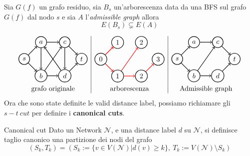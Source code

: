 \documentclass[a4paper, 11pt]{report}
\newcommand*{\mc}[1]{\mathcal{#1}}
\begin{document}
\begin{obs}{}{}
    Sia $G(f)$ un grafo residuo, sia $B_s$ un'arborescenza data da una BFS sul grafo $G(f)$ dal nodo $s$ e sia $A$ l'\textit{admissible graph} allora
    \[E(B_s)\subsetneq E(A)\]
\end{obs}

\[
    \begin{array}{c|c|c}
        
    
    \begin{tikzpicture}[node distance={12mm}, thick , main/.style = {draw, circle}] 
    \node[main] (1) {$s$}; 
    \node[main] (2) [above right of=1] {$a$};
    \node[main] (3) [below right of=1] {$b$};
    \node[main] (4) [right of=2] {$c$};
    \node[main] (5) [right of=3] {$d$};
    \node[main] (6) [above right of=5] {$t$};
    \draw[->] (1) to (2);
    \draw[->] (1) to (3);
    \draw[->] (3) to (5);
    \draw[->] (2) to (4);
    \draw[->] (5) to (6);
    \draw[->] (4) to (6);
    \draw[->] (3) to (4);
    \draw[->] (4) to (5);
    \draw[->] (5) to (2);
    \draw[->] (2) to (3);
\end{tikzpicture}  &
\begin{tikzpicture}[node distance={12mm}, thick , main/.style = {draw, circle}] 
    \node[main] (1) {$0$}; 
    \node[main] (2) [above right of=1] {$1$};
    \node[main] (3) [below right of=1] {$1$};
    \node[main] (4) [right of=2] {$2$};
    \node[main] (5) [right of=3] {$2$};
    \node[main] (6) [above right of=5] {$3$};
    \draw[->, red] (1) to (2);
    \draw[->, red] (1) to (3);
    \draw[->, red] (3) to (5);
    \draw[->, red] (5) to (6);
    \draw[->, red] (3) to (4);
\end{tikzpicture} &
\begin{tikzpicture}[node distance={12mm}, thick , main/.style = {draw, circle}] 
    \node[main] (1) {$s$}; 
    \node[main] (2) [above right of=1] {$a$};
    \node[main] (3) [below right of=1] {$b$};
    \node[main] (4) [right of=2] {$c$};
    \node[main] (5) [right of=3] {$d$};
    \node[main] (6) [above right of=5] {$t$};
    \draw[->] (1) to (2);
    \draw[->] (1) to (3);
    \draw[->] (3) to (5);
    \draw[->] (5) to (6);
    \draw[->] (3) to (4);
    \draw[->] (2) to (4);
    \draw[->] (4) to (6);
\end{tikzpicture} \\
\text{grafo originale}&\text{arborescenza} & \text{Admissible graph}
\end{array} 
\]
Ora che sono state definite le valid distance label, possiamo richiamare gli $s-t\ cut$ per definire i \textbf{canonical cuts}.
\begin{definition}[label = cancut]{Canonical cut}{}
    Dato un Network $\mc{N}$, e una distance label $d$ su $\mc{N}$, si definisce taglio canonico una partizione dei nodi del grafo 
    \[(S_k, T_k) =  (S_k:=\{v\in V(\mc{N}) | d(v) \ge k\},\ T_k := V(\mc{N})\setminus S_k)\]
\end{definition}
\end{document}
